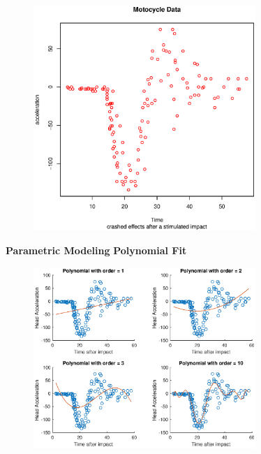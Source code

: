 \documentclass[19pt,landscaoe]{article}
\begin{document}
\begin{figure}[h]
\centering
      \includegraphics[width=0.75\textwidth,height=0.52\textwidth]{MotocycleData.eps}
    \label{figure2} 

\end{figure}

\newpage
{\LARGE{\textbf{Parametric Modeling}}}
\vskip25pt
{\Large\bf{Polynomial Fit}}

\begin{figure}[h]
\centering
      \includegraphics[width=0.75\textwidth,height=0.52\textwidth]{polyfitting.eps}
    \label{figure3} 

\end{figure}
\end{document}

